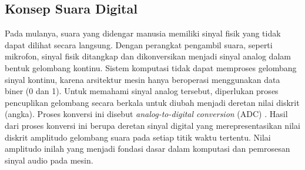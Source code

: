 \subsection{Konsep Suara Digital} \label{II.Teori2}
Pada mulanya, suara yang didengar manusia memiliki sinyal fisik yang tidak dapat dilihat secara langsung.
Dengan perangkat pengambil suara, seperti mikrofon, sinyal fisik ditangkap dan dikonversikan menjadi sinyal analog dalam bentuk gelombang kontinu.
Sistem komputasi tidak dapat memproses gelombang sinyal kontinu, karena arsitektur mesin hanya beroperasi menggunakan data biner (0 dan 1).
Untuk memahami sinyal analog tersebut, diperlukan proses pencuplikan gelombang secara berkala untuk diubah menjadi deretan nilai diskrit (angka). 
Proses konversi ini disebut \textit{analog-to-digital conversion} (ADC) \cite{oppenheim2010discrete}.
Hasil dari proses konversi ini berupa deretan sinyal digital yang merepresentasikan nilai diskrit amplitudo gelombang suara pada setiap titik waktu tertentu. 
Nilai amplitudo inilah yang menjadi fondasi dasar dalam komputasi dan pemrosesan sinyal audio pada mesin. \par

